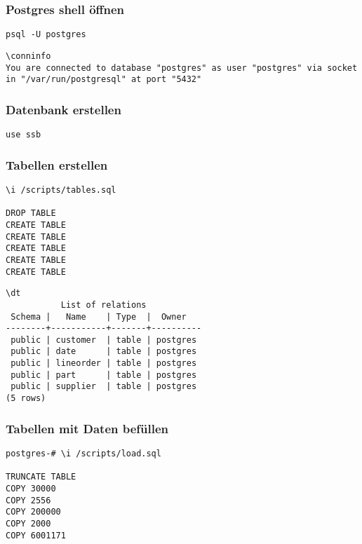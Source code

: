 \subsubsection{Postgres shell öffnen}
\begin{lstlisting}[caption=Postgres Shell öffnen, label=code:postgresopen]
psql -U postgres
\end{lstlisting}

\begin{lstlisting}[caption=Verbindungsinformationen, label=code:conninfo]
\conninfo
You are connected to database "postgres" as user "postgres" via socket in "/var/run/postgresql" at port "5432"
\end{lstlisting}

\subsubsection{Datenbank erstellen}
\begin{lstlisting}[caption=Datenbank erstellen, label=code:createdb]
use ssb
\end{lstlisting}

\subsubsection{Tabellen erstellen}
\begin{lstlisting}[caption=Tabellen erstellen, label=code:createtables]
\i /scripts/tables.sql

DROP TABLE
CREATE TABLE
CREATE TABLE
CREATE TABLE
CREATE TABLE
CREATE TABLE
\end{lstlisting}

\begin{lstlisting}[caption=Liste der Tabellen, label=code:listtables]
\dt
           List of relations
 Schema |   Name    | Type  |  Owner
--------+-----------+-------+----------
 public | customer  | table | postgres
 public | date      | table | postgres
 public | lineorder | table | postgres
 public | part      | table | postgres
 public | supplier  | table | postgres
(5 rows)
\end{lstlisting}

\subsubsection{Tabellen mit Daten befüllen}
\begin{lstlisting}[caption=Tabellen mit Daten befüllen, label=code:loaddata]
postgres-# \i /scripts/load.sql

TRUNCATE TABLE
COPY 30000
COPY 2556
COPY 200000
COPY 2000
COPY 6001171
\end{lstlisting}

